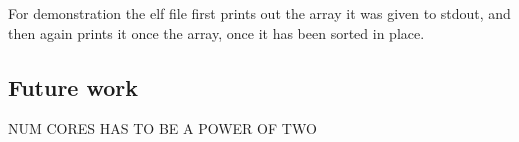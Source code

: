 For demonstration the elf file first prints out the array it was given to
stdout, and then again prints it once the array, once it has been sorted in
place.


\subsection{Future work}
NUM CORES HAS TO BE A POWER OF TWO


